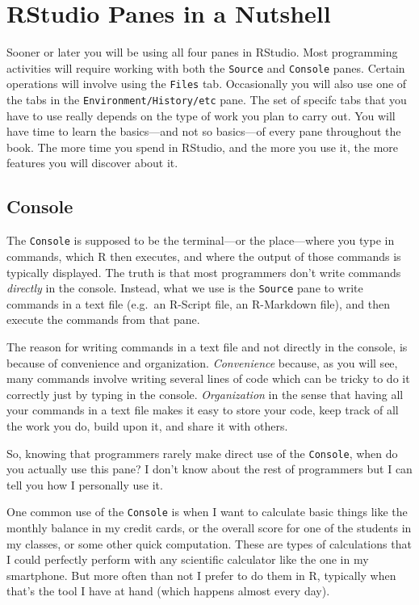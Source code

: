 \documentclass[
]{book}
\begin{document}
\hypertarget{rstudio-panes-in-a-nutshell}{%
\section{RStudio Panes in a Nutshell}\label{rstudio-panes-in-a-nutshell}}

Sooner or later you will be using all four panes in RStudio. Most programming
activities will require working with both the \texttt{Source} and \texttt{Console} panes.
Certain operations will involve using the \texttt{Files} tab. Occasionally you will
also use one of the tabs in the \texttt{Environment/History/etc} pane. The set of
specifc tabs that you have to use really depends on the type of work you plan
to carry out. You will have time to learn the basics---and not so basics---of
every pane throughout the book. The more time you spend in RStudio, and the
more you use it, the more features you will discover about it.

\hypertarget{console}{%
\subsection{Console}\label{console}}

The \texttt{Console} is supposed to be the terminal---or the place---where you type in
commands, which R then executes, and where the output of those commands is
typically displayed. The truth is that most programmers don't write commands
\emph{directly} in the console. Instead, what we use is the \texttt{Source} pane to write
commands in a text file (e.g.~an R-Script file, an R-Markdown file), and then
execute the commands from that pane.

The reason for writing commands in a text file and not directly in the console,
is because of convenience and organization. \emph{Convenience} because, as you will
see, many commands involve writing several lines of code which can be tricky to
do it correctly just by typing in the console. \emph{Organization} in the sense that
having all your commands in a text file makes it easy to store your code,
keep track of all the work you do, build upon it, and share it with others.

So, knowing that programmers rarely make direct use of the \texttt{Console}, when
do you actually use this pane? I don't know about the rest of programmers but
I can tell you how I personally use it.

One common use of the \texttt{Console} is when I want to calculate basic things like
the monthly balance in my credit cards, or the overall score for one of the
students in my classes, or some other quick computation. These are types of
calculations that I could perfectly perform with any scientific calculator
like the one in my smartphone. But more often than not I prefer to do them in R,
typically when that's the tool I have at hand (which happens almost every day).
\end{document}
